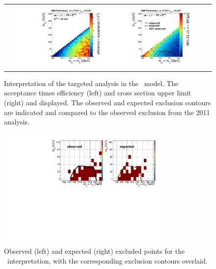 \begin{figure}[!ht]
\begin{center}
\begin{tabular}{cc}
\includegraphics[width=0.45\textwidth]{plots/wzsms_eff.pdf}
\includegraphics[width=0.45\textwidth]{plots/wzsms_xsec.pdf}
\end{tabular}
\caption{ Interpretation of the targeted analysis in the \wzmet\ model. The acceptance times efficiency (left) and cross section
upper limit (right) and displayed. The observed and expected exclusion contours are indicated and compared to the observed
exclusion from the 2011 analysis.
\label{fig:results_wzmet}}
\end{center}
\end{figure}

\begin{figure}[!hb]
\begin{center}
\includegraphics[width=0.75\textwidth]{plots/wzsms_points.pdf}
\caption{ Observed (left) and expected (right) excluded points for the \wzmet\ interpretation, with the corresponding exclusion contours overlaid.
\label{fig:results_wzmetpoints}}
\end{center}
\end{figure}

